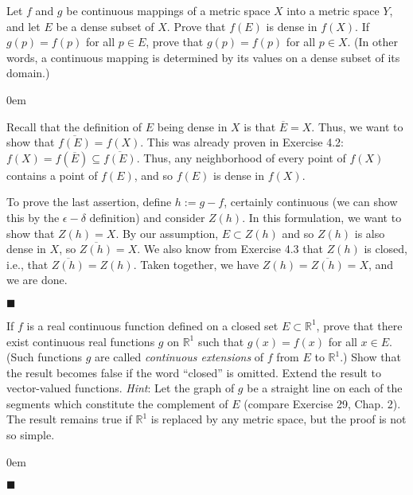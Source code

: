 \documentclass[12pt]{article}
\renewcommand{\qed}{\hfill$\blacksquare$}
\renewenvironment{proof}{\begin{addmargin}[1em]{0em}\begin{newproof}}{\end{newproof}\end{addmargin}\qed}
\newenvironment{problem}[2][Exercise]{\begin{trivlist}
\item[\hskip \labelsep {\bfseries #1}\hskip \labelsep {\bfseries #2.}]}{\end{trivlist}}
\begin{document}
\begin{problem}{4.4}
Let $f$ and $g$ be continuous mappings of a metric space $X$ into a metric space $Y$, and let $E$ be a dense subset of $X$. Prove that $f\left(E\right)$ is dense in $f\left(X\right)$. If $g\left(p\right)=f\left(p\right)$ for all $p\in E$, prove that $g\left(p\right)=f\left(p\right)$ for all $p\in X$. (In other words, a continuous mapping is determined by its values on a dense subset of its domain.)
\end{problem}
\begin{proof}
Recall that the definition of $E$ being dense in $X$ is that $\overline{E}=X$. Thus, we want to show that $\overline{f\left(E\right)} = f\left(X\right)$. This was already proven in Exercise 4.2: $f\left(X\right) = f\left(\overline{E}\right) \subseteq \overline{f\left(E\right)}$. Thus, any neighborhood of every point of $f\left(X\right)$ contains a point of $f\left(E\right)$, and so $f\left(E\right)$ is dense in $f\left(X\right)$.

To prove the last assertion, define $h := g-f$, certainly continuous (we can show this by the $\epsilon-\delta$ definition) and consider $Z\left(h\right)$. In this formulation, we want to show that $Z\left(h\right) = X$. By our assumption, $E\subset Z\left(h\right)$ and so $Z\left(h\right)$ is also dense in $X$, so $\overline{Z\left(h\right)}=X$. We also know from Exercise 4.3 that $Z\left(h\right)$ is closed, i.e., that $\overline{Z\left(h\right)} = Z\left(h\right)$. Taken together, we have $Z\left(h\right)=\overline{Z\left(h\right)} = X$, and we are done.
\end{proof}



\begin{problem}{4.5}
If $f$ is a real continuous function defined on a closed set $E\subset \mathbb{R}^1$, prove that there exist continuous real functions $g$ on $\mathbb{R}^1$ such that $g\left(x\right)=f\left(x\right)$ for all $x\in E$. (Such functions $g$ are called \textit{continuous extensions} of $f$ from $E$ to $\mathbb{R}^1$.) Show that the result becomes false if the word ``closed'' is omitted. Extend the result to vector-valued functions. \textit{Hint}: Let the graph of $g$ be a straight line on each of the segments which constitute the complement of $E$ (compare Exercise 29, Chap. 2). The result remains true if $\mathbb{R}^1$ is replaced by any metric space, but the proof is not so simple.
\end{problem}
\begin{proof}

\end{proof}
\end{document}
